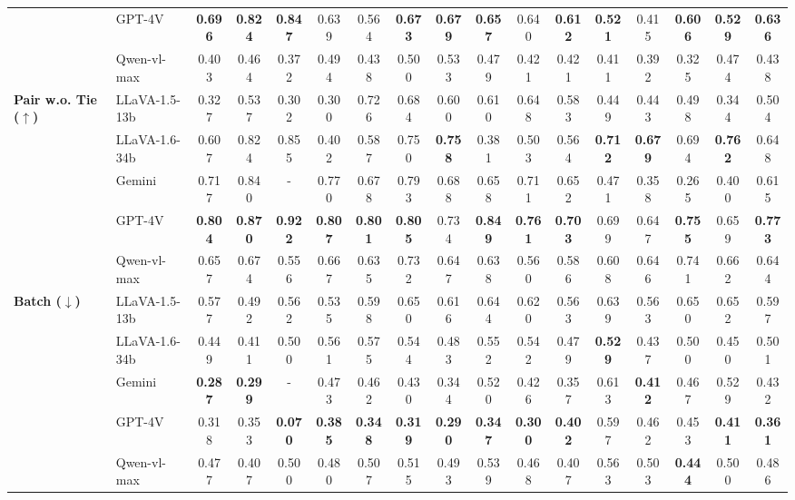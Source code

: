 \begin{table*}[htbp]
{\begin{tabular}{ll|ccccccccccccccc}
 & GPT-4V & \textbf{0.696} & \textbf{0.824} & \textbf{0.847} & 0.639 & 0.564 & \textbf{0.673} & \textbf{0.679} & \textbf{0.657} & 0.640 & \textbf{0.612} & \textbf{0.521} & 0.415 & \textbf{0.606} & \textbf{0.529} & \textbf{0.636} \\
 & Qwen-vl-max & 0.403 & 0.464 & 0.372 & 0.494 & 0.438 & 0.500 & 0.533 & 0.479 & 0.421 & 0.421 & 0.411 & 0.392 & 0.325 & 0.474 & 0.438 \\ \midrule
\multirow{5}{*}{\textbf{Pair w.o. Tie ($\uparrow$)}} & LLaVA-1.5-13b & 0.327 & 0.537 & 0.302 & 0.300 & 0.726 & 0.684 & 0.600 & 0.610 & 0.648 & 0.583 & 0.449 & 0.443 & 0.498 & 0.344 & 0.504 \\
 & LLaVA-1.6-34b & 0.607 & 0.824 & 0.855 & 0.402 & 0.587 & 0.750 & \textbf{0.758} & 0.381 & 0.503 & 0.564 & \textbf{0.712} & \textbf{0.679} & 0.694 & \textbf{0.762} & 0.648 \\
 & Gemini & 0.717 & 0.840 & - & 0.770 & 0.678 & 0.793 & 0.688 & 0.658 & 0.711 & 0.652 & 0.471 & 0.358 & 0.265 & 0.400 & 0.615 \\
 & GPT-4V & \textbf{0.804} & \textbf{0.870} & \textbf{0.922} & \textbf{0.807} & \textbf{0.801} & \textbf{0.805} & 0.734 & \textbf{0.849} & \textbf{0.761} & \textbf{0.703} & 0.699 & 0.647 & \textbf{0.755} & 0.659 & \textbf{0.773} \\
 & Qwen-vl-max & 0.657 & 0.674 & 0.556 & 0.667 & 0.635 & 0.732 & 0.647 & 0.638 & 0.560 & 0.586 & 0.608 & 0.646 & 0.741 & 0.662 & 0.644 \\ \midrule
\multirow{5}{*}{\textbf{Batch ($\downarrow$)}} & LLaVA-1.5-13b & 0.577 & 0.492 & 0.562 & 0.535 & 0.598 & 0.650 & 0.616 & 0.644 & 0.620 & 0.563 & 0.639 & 0.563 & 0.650 & 0.652 & 0.597 \\
 & LLaVA-1.6-34b & 0.449 & 0.411 & 0.500 & 0.561 & 0.575 & 0.544 & 0.483 & 0.552 & 0.542 & 0.479 & \textbf{0.529} & 0.437 & 0.500 & 0.450 & 0.501 \\
 & Gemini & \textbf{0.287} & \textbf{0.299} & - & 0.473 & 0.462 & 0.430 & 0.344 & 0.520 & 0.426 & 0.357 & 0.613 & \textbf{0.412} & 0.467 & 0.529 & 0.432 \\
 & GPT-4V & 0.318 & 0.353 & \textbf{0.070} & \textbf{0.385} & \textbf{0.348} & \textbf{0.319} & \textbf{0.290} & \textbf{0.347} & \textbf{0.300} & \textbf{0.402} & 0.597 & 0.462 & 0.453 & \textbf{0.411} & \textbf{0.361} \\
 & Qwen-vl-max & 0.477 & 0.407 & 0.500 & 0.480 & 0.507 & 0.515 & 0.493 & 0.539 & 0.468 & 0.407 & 0.563 & 0.503 & \textbf{0.444} & 0.500 & 0.486 \\ \bottomrule[1.5pt]
\end{tabular}}
  \vspace{-10pt}
\end{table*}

